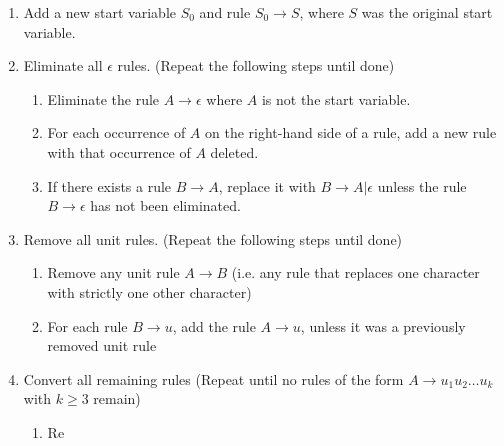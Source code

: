 \begin{tecbox}{}{}
    \begin{enumerate}
        \item Add a new start variable $S_0$ and rule $S_0 \to S$, where $S$ was the original start variable.
        \item Eliminate all $\epsilon$ rules. (Repeat the following steps until done)
        \begin{enumerate}
            \item Eliminate the rule $A \to \epsilon$ where $A$ is not the start variable.
            \item For each occurrence of $A$ on the right-hand side of a rule, add a new rule with that occurrence of $A$ deleted.
            \item If there exists a rule $B \to A$, replace it with $B \to A | \epsilon$ unless the rule $B \to \epsilon$ has not been eliminated.
        \end{enumerate}
        \item Remove all unit rules. (Repeat the following steps until done)
        \begin{enumerate}
            \item Remove any unit rule $A \to B$ (i.e. any rule that replaces one character with strictly one other character)
            \item For each rule $B \to u$, add the rule $A \to u$, unless it was a previously removed unit rule
        \end{enumerate}
        \item Convert all remaining rules (Repeat until no rules of the form $A \to u_1 u_2 \ldots u_k$ with $k \geq 3$ remain)
        \begin{enumerate}
            \item Re
        \end{enumerate}
    \end{enumerate}
\end{tecbox}

